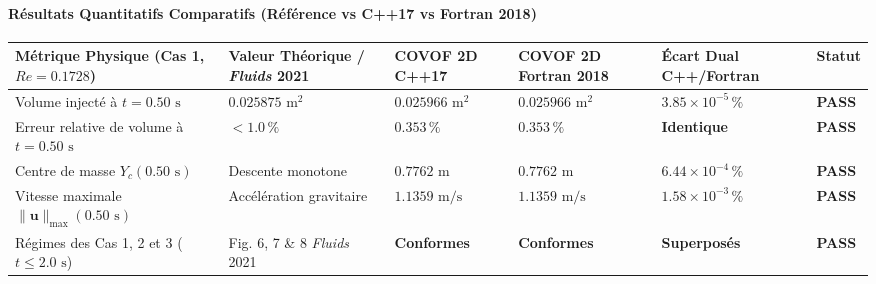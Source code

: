 \documentclass[
  10pt,
]{article}
\newcounter{none} %
\begin{document}
\paragraph{Résultats Quantitatifs Comparatifs (Référence vs C++17 vs
Fortran
2018)}\label{ruxe9sultats-quantitatifs-comparatifs-ruxe9fuxe9rence-vs-c17-vs-fortran-2018-16}

{\def\LTcaptype{none} %
\begin{longtable}[]{@{}
  >{\raggedright\arraybackslash}p{}
  >{\centering\arraybackslash}p{}
  >{\centering\arraybackslash}p{}
  >{\centering\arraybackslash}p{}
  >{\centering\arraybackslash}p{}
  >{\centering\arraybackslash}p{}@{}}
\toprule\noalign{}
\begin{minipage}[b]{\linewidth}\raggedright
Métrique Physique (Cas 1, \(Re = 0.1728\))
\end{minipage} & \begin{minipage}[b]{\linewidth}\centering
Valeur Théorique / \emph{Fluids} 2021
\end{minipage} & \begin{minipage}[b]{\linewidth}\centering
COVOF 2D C++17
\end{minipage} & \begin{minipage}[b]{\linewidth}\centering
COVOF 2D Fortran 2018
\end{minipage} & \begin{minipage}[b]{\linewidth}\centering
Écart Dual C++/Fortran
\end{minipage} & \begin{minipage}[b]{\linewidth}\centering
Statut
\end{minipage} \\
\midrule\noalign{}
\endhead
\bottomrule\noalign{}
\endlastfoot
Volume injecté à \(t = 0.50\text{ s}\) & \(0.025875\text{ m}^2\) &
\textbf{\(0.025966\text{ m}^2\)} & \textbf{\(0.025966\text{ m}^2\)} &
\textbf{\(3.85 \times 10^{-5}\,\%\)} & \textbf{PASS} \\
Erreur relative de volume à \(t = 0.50\text{ s}\) & \(< 1.0\,\%\) &
\textbf{\(0.353\,\%\)} & \textbf{\(0.353\,\%\)} & \textbf{Identique} &
\textbf{PASS} \\
Centre de masse \(Y_c(0.50\text{ s})\) & Descente monotone &
\textbf{\(0.7762\text{ m}\)} & \textbf{\(0.7762\text{ m}\)} &
\textbf{\(6.44 \times 10^{-4}\,\%\)} & \textbf{PASS} \\
Vitesse maximale \(\|\mathbf{u}\|_{\max}(0.50\text{ s})\) & Accélération
gravitaire & \textbf{\(1.1359\text{ m/s}\)} &
\textbf{\(1.1359\text{ m/s}\)} & \textbf{\(1.58 \times 10^{-3}\,\%\)} &
\textbf{PASS} \\
Régimes des Cas 1, 2 et 3 (\(t \le 2.0\text{ s}\)) & Fig. 6, 7 \& 8
\emph{Fluids} 2021 & \textbf{Conformes} & \textbf{Conformes} &
\textbf{Superposés} & \textbf{PASS} \\
\end{longtable}
}
\end{document}
